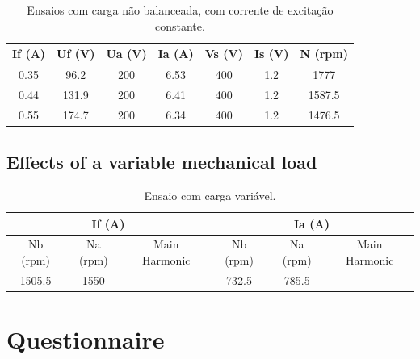 \documentclass[12pt,a4paper,oneside]{article}
\begin{document}
\begin{table}[htb!]
\centering
\begin{tabular}{ccccccc}
\hline
If (A) & Uf (V) & Ua (V) & Ia (A) & Vs (V) & Is (V) & N (rpm) \\ \hline
0.35 & 96.2 & 200 & 6.53 & 400 & 1.2 & 1777 \\ \hline
0.44 & 131.9 & 200 & 6.41 & 400 & 1.2 & 1587.5 \\ \hline
0.55 & 174.7 & 200 & 6.34 & 400 & 1.2 & 1476.5 \\ \hline
\end{tabular}
\caption{Ensaios com carga não balanceada, com corrente de excitação constante.}
\label{tab:load2}
\end{table}
\subsection{Effects of a variable mechanical load}

\begin{table}[htb!]
\centering
\begin{tabular}{ccc|ccc}
\hline
\multicolumn{3}{c|}{If (A)} & \multicolumn{3}{c|}{Ia (A)} \\ \hline
Nb (rpm) & Na (rpm) & Main Harmonic & Nb (rpm) & Na (rpm) & Main Harmonic \\ \hline
1505.5 & 1550 &  & 732.5 & 785.5 &  \\ \hline
\end{tabular}
\caption{Ensaio com carga variável.}
\label{tab:load3}
\end{table}

\section{Questionnaire}
\subsection{}
\subsection{}
\subsection{}
\end{document}
